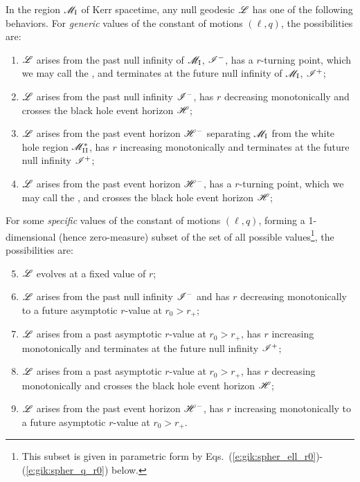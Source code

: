\begin{greybox}
In the region $\mathscr{M}_{\rm I}$ of Kerr spacetime,
any null geodesic $\mathscr{L}$ has one of the following behaviors.
For \emph{generic} values of the constant of motions $(\ell, q)$, the possibilities are:
\begin{enumerate}
\item $\mathscr{L}$ arises from the past null infinity of $\mathscr{M}_{\rm I}$, $\mathscr{I}^-$, has a $r$-turning point,
which we may call the , and terminates at the future null infinity
of $\mathscr{M}_{\rm I}$, $\mathscr{I}^+$;
\item $\mathscr{L}$ arises from the past null infinity $\mathscr{I}^-$, has $r$ decreasing
monotonically and crosses the black hole event horizon $\mathscr{H}$;
\item $\mathscr{L}$ arises from the past event horizon $\mathscr{H}^-$ separating $\mathscr{M}_{\rm I}$
from the white hole region $\mathscr{M}_{\rm II}^*$, has $r$ increasing monotonically and
terminates at the future null infinity $\mathscr{I}^+$;
\item $\mathscr{L}$ arises from the past event horizon $\mathscr{H}^-$, has a $r$-turning point,
which we may call the , and crosses the black hole event horizon $\mathscr{H}$;
\end{enumerate}
For some \emph{specific} values of the constant of motions $(\ell, q)$,
forming a 1-dimensional (hence zero-measure) subset of the set of all possible values\footnote{This
subset is given in parametric form by Eqs.~(\ref{e:gik:spher_ell_r0})-(\ref{e:gik:spher_q_r0}) below.},
the possibilities are:
\begin{enumerate}
\setcounter{enumi}{4}
\item $\mathscr{L}$ evolves at a fixed value of $r$;
\item $\mathscr{L}$ arises from the past null infinity $\mathscr{I}^-$
and has $r$ decreasing monotonically to
a future asymptotic $r$-value at $r_0 > r_+$;
\item $\mathscr{L}$ arises from a past asymptotic $r$-value at $r_0 > r_+$, has
$r$ increasing monotonically and terminates at the future null infinity
$\mathscr{I}^+$;
\item $\mathscr{L}$ arises from a past asymptotic $r$-value at $r_0 > r_+$, has
$r$ decreasing monotonically and crosses the black hole event horizon $\mathscr{H}$;
\item $\mathscr{L}$ arises from the past event horizon $\mathscr{H}^-$, has
$r$ increasing monotonically to
a future asymptotic $r$-value at $r_0 > r_+$.
\end{enumerate}
\end{greybox}


